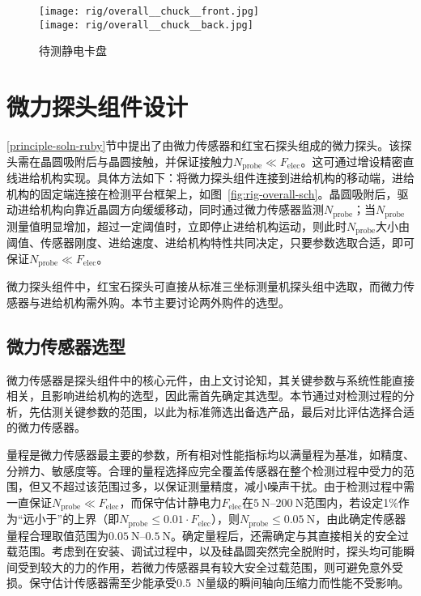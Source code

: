 \begin{figure}[p]
\centering
\texttt{[image: rig/overall\_\_chuck\_\_front.jpg]} \\
\texttt{[image: rig/overall\_\_chuck\_\_back.jpg]}
\caption{待测静电卡盘}
\label{fig:rig-overall-chuck}
\end{figure}



\clearpage



\section{微力探头组件设计}\label{sec:rig-probe}

\ref{principle-soln-ruby}节中提出了由微力传感器和红宝石探头组成的微力探头。该探头需在晶圆吸附后与晶圆接触，并保证接触力$N_{\mathrm{probe}} \ll F_{\mathrm{elec}}$。这可通过增设精密直线进给机构实现。具体方法如下：将微力探头组件连接到进给机构的移动端，进给机构的固定端连接在检测平台框架上，如图~\ref{fig:rig-overall-sch}。晶圆吸附后，驱动进给机构向靠近晶圆方向缓缓移动，同时通过微力传感器监测$N_{\mathrm{probe}}$；当$N_{\mathrm{probe}}$测量值明显增加，超过一定阈值\footnotemark{}时，立即停止进给机构运动，则此时$N_{\mathrm{probe}}$大小由阈值、传感器刚度、进给速度、进给机构特性共同决定，只要参数选取合适，即可保证$N_{\mathrm{probe}} \ll F_{\mathrm{elec}}$。


微力探头组件中，红宝石探头可直接从标准三坐标测量机探头组中选取，而微力传感器与进给机构需外购。本节主要讨论两外购件的选型。


\subsection{微力传感器选型}\label{sec:rig-probe-sensor}

微力传感器是探头组件中的核心元件，由上文讨论知，其关键参数与系统性能直接相关，且影响进给机构的选型，因此需首先确定其选型。本节通过对检测过程的分析，先估测关键参数的范围，以此为标准筛选出备选产品，最后对比评估选择合适的微力传感器。

量程是微力传感器最主要的参数，所有相对性能指标均以满量程为基准，如精度、分辨力、敏感度等。合理的量程选择应完全覆盖传感器在整个检测过程中受力的范围，但又不超过该范围过多，以保证测量精度，减小噪声干扰。由于检测过程中需一直保证$N_{\mathrm{probe}} \ll F_{\mathrm{elec}}$，而保守估计静电力$F_{\mathrm{elec}}$在$\SIrange{5}{200}{\N}$范围内，若设定1\%作为“远小于”的上界（即$N_{\mathrm{probe}} \leq 0.01 \cdot F_{\mathrm{elec}}$），则$N_{\mathrm{probe}} \leq \SI{0.05}{\N}$，由此确定传感器量程合理取值范围为$\SIrange{0.05}{0.5}{\N}$。确定量程后，还需确定与其直接相关的安全过载范围。考虑到在安装、调试过程中，以及硅晶圆突然完全脱附时，探头均可能瞬间受到较大的力的作用，若微力传感器具有较大安全过载范围，则可避免意外受损。保守估计传感器需至少能承受\SI{0.5}{\N}量级的瞬间轴向压缩力而性能不受影响。

